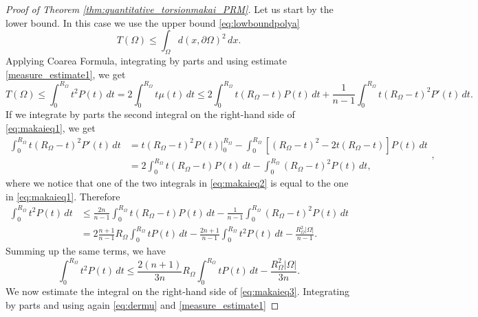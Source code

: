 \documentclass[oneside,a4paper,11pt,notitlepage]{article}
\newcommand{\abs}[1]{{\left|#1\right|}}
\theoremstyle{definition}
\theoremstyle{plain}
\theoremstyle{definition}
\begin{document}
\begin{proof}[Proof of Theorem \ref{thm:quantitative_torsionmakai_PRM}]
    Let us start by the lower bound. In this case we use the upper bound \eqref{eq:lowboundpolya}
    \begin{equation*}
        T(\Omega) \le \int_{\Omega}d(x,\partial\Omega)^2\,dx.
    \end{equation*}
    Applying Coarea Formula, integrating by parts and using estimate \eqref{measure_estimate1}, we get
    \begin{equation}\label{eq:makaieq1}
        T(\Omega) \le \int_0^{R_\Omega}t^2P(t)\,dt= 2\int_0^{R_\Omega}t\mu(t)\,dt\le 2\int_0^{R_\Omega}t(R_\Omega-t)P(t)\,dt+ \frac{1}{n-1}\int_0^{R_\Omega}t(R_\Omega-t)^2P'(t)\,dt.
    \end{equation}
    If we integrate by parts the second integral on the right-hand side of \eqref{eq:makaieq1}, we get
    \begin{equation}\label{eq:makaieq2}
    \begin{split}
\int_0^{R_\Omega}t(R_\Omega-t)^2P'(t)\,dt&= t(R_\Omega-t)^2P(t)\bigg|_0^{R_\Omega}-\int_0^{R_\Omega}[(R_\Omega-t)^2-2t(R_\Omega-t)]P(t)\,dt\\
&=2\int_0^{R_\Omega}t(R_\Omega-t)P(t)\,dt-\int_0^{R_\Omega}(R_\Omega-t)^2P(t)\,dt,
    \end{split},
    \end{equation}
    where we notice that one of the two integrals in \eqref{eq:makaieq2} is equal to the one in \eqref{eq:makaieq1}. Therefore
    \begin{equation*}
        \begin{split}\int_0^{R_\Omega}t^2P(t)\,dt&\le \frac{2n}{n-1}\int_0^{R_\Omega}t(R_\Omega-t)P(t)\,dt-\frac{1}{n-1}\int_0^{R_\Omega}(R_\Omega-t)^2P(t)\,dt \\
        &=2\frac{n+1}{n-1}R_\Omega\int_0^{R_\Omega}tP(t)\,dt-\frac{2n+1}{n-1}\int_0^{R_\Omega}t^2P(t)\,dt-\frac{R_\Omega^2\abs{\Omega}}{n-1}.
        \end{split}
    \end{equation*}
    Summing up the same terms, we have
    \begin{equation}\label{eq:makaieq3}
        \int_0^{R_\Omega}t^2P(t)\,dt\le \frac{2(n+1)}{3n}R_\Omega \int_{0}^{R_\Omega}tP(t)\,dt-\frac{R_\Omega^2\abs{\Omega}}{3n}.
    \end{equation}
    We now estimate the integral on the right-hand side of \eqref{eq:makaieq3}. Integrating by parts and using again \eqref{eq:dermu} and \eqref{measure_estimate1}

\end{proof}
\end{document}
